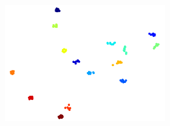 \begin{figure}[htp]
\begin{subfigure}{0.49\linewidth}
\begin{subfigure}{0.49\linewidth}
			\includegraphics[trim={0cm 0cm 0cm 0cm},clip, width=1.0\linewidth]{fig/factor/tsne15}
			\end{subfigure}


\end{subfigure}
\end{figure}
